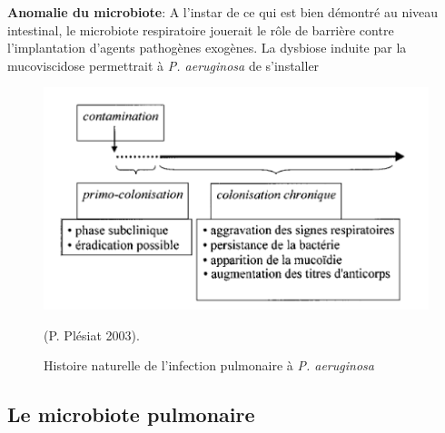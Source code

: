 \documentclass[12pt,a4paper]{article}
\begin{document}
\textbf{Anomalie du microbiote\cite{Keravec2015,Bernarde2015,HoMan2017,Nguyen2015}}:
A l'instar de ce qui est bien démontré au niveau intestinal, le microbiote respiratoire jouerait le rôle de barrière contre l'implantation d'agents pathogènes exogènes. La dysbiose induite par la mucoviscidose permettrait à \textit{P. aeruginosa} de s'installer


\begin{figure}[ht]
\begin{center}
\includegraphics[scale=0.8]{img/chronic.png}\hfill
\end{center}
\caption{Histoire naturelle de l'infection pulmonaire à \textit{P. aeruginosa}} 
\centering (P. Plésiat 2003\cite{Plesiat}).
\label{bach}
\end{figure}


\subsection{Le microbiote pulmonaire}
\end{document}

